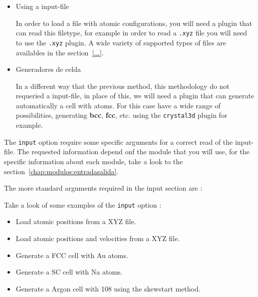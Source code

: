 \begin{itemize}
\item{Using a input-file}

In order to load a file with atomic configurations, you will need a plugin that
can read this filetype, for example in order to read a \verb|.xyz| file you
will need to use the \verb|.xyz| plugin. A wide variety of supported types of
files are availables in the section~\ref{...}.
  
\item{Generadores de celda}

In a different way that the previous method, this methodology do not requeried
a input-file, in place of this, we will need a plugin that can generate
automatically a cell with atoms. For this case {\lpmd} have a wide range of
possibilities, generating \textbf{bcc}, \textbf{fcc}, etc. using the
\verb|crystal3d| plugin for example.
\end{itemize}

The \verb|input| option require some specific arguments for a correct read of
the input-file. The requested information depend onf the module that you will
use, for the specific information about each module, take a look to the
section~\ref{chap:modulos:entradasalida}. 

The more standard arguments required in the input section are :


Take a look of some examples of the \verb|input| option :

\begin{itemize}
\item Load atomic positions from a XYZ file.
\item Load atomic positions and velocities from a XYZ file.
\item Generate a FCC cell with Au atoms.
\item Generate a SC cell with Na atoms.
\item Generate a Argon cell with 108 using the skewstart method.
\end{itemize}

